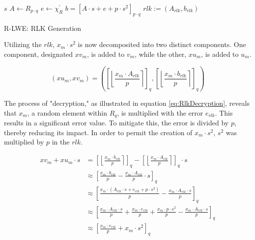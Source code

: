 \begin{algorithm}[htb]
  \begin{algorithmic}[1]
    \REQUIRE $s$
    \STATE $A \leftarrow R_{p \cdot q}$
    \STATE $e \leftarrow \chi_R^{'}$
    \STATE $b = [A\cdot s+e+p\cdot s^2]_{p \cdot q}$
    \RETURN $rlk:=(A_{rlk}, b_{rlk})$
  \end{algorithmic}
  \caption{R-LWE: RLK Generation}
  \label{alg:RingRLKGeneration}
\end{algorithm}

Utilizing the $rlk$, $x_m\cdot s^2$ is now decomposited into two distinct components. One component, designated $xv_m$, is added to $v_m$, while the other, $xu_m$, is added to $u_m$.

\begin{equation}
  (xu_m, xv_m) = (\left[\left\lfloor \frac{x_m \cdot A_{rlk}}{p}  \right\rceil \right]_q, \left[\left\lfloor \frac{x_m \cdot b_{rlk}}{p}  \right\rceil \right]_q )
\end{equation}

The process of "decryption," as illustrated in equation \ref{eq:RlkDecryption}, reveals that $x_m$, a random element within $R_q$, is multiplied with the error $e_{rlk}$. This results in a significant error value. To mitigate this, the error is divided by $p$, thereby reducing its impact. In order to permit the creation of $x_m \cdot s^2$, $s^2$ was multiplied by $p$ in the $rlk$.

\begin{equation}
  \begin{split}
    xv_m + xu_m \cdot s & = \left[\left\lfloor \frac{x_m \cdot b_{rlk}}{p}  \right\rceil \right]_q - \left[\left\lfloor \frac{x_m \cdot A_{rlk}}{p}  \right\rceil \right]_q \cdot s  \\
                        & \approx \left[\frac{x_m \cdot b_{rlk}}{p} - \frac{x_m \cdot A_{rlk}}{p} \cdot s\right]_q                                                                   \\
                        & \approx \left[\frac{x_m \cdot (A_{rlk}\cdot s+e_{rlk}+p\cdot s^2)}{p} - \frac{x_m \cdot A_{rlk} \cdot s}{p}\right]_q                                       \\
                        & \approx \left[\frac{x_m \cdot A_{rlk}\cdot s}{p}+\frac{x_m \cdot e_{rlk}}{p}+\frac{x_m \cdot p\cdot s^2}{p} - \frac{x_m \cdot A_{rlk} \cdot s}{p}\right]_q \\
                        & \approx \left[\frac{x_m \cdot e_{rlk}}{p}+ x_m \cdot s^2 \right]_q
  \end{split}
  \label{eq:RlkDecryption}
\end{equation}

